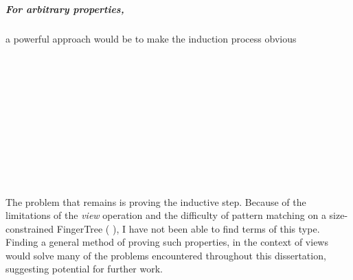 \documentclass[12pt,twoside,notitlepage]{report}
\begin{document}
\subparagraph{For arbitrary properties,} a powerful approach would be to make the induction process obvious

\begin{code}
\\
\>[0]\<[6]%
\>[6] \AgdaSymbol{:}     \<%
\end{code}
\begin{code}
\\
\>[0]\<[6]%
\>[6] \AgdaSymbol{:}  \AgdaSymbol{\{} \AgdaSymbol{:} \AgdaSymbol{\}}\<%
\\
\>[6]\<[16]%
\>[16] \AgdaSymbol{(} \AgdaSymbol{:}   \AgdaSymbol{((} \AgdaSymbol{)}  \AgdaSymbol{))}\<%
\\
\>[6]\<[16]%
\>[16] \AgdaSymbol{(} \AgdaSymbol{:}  \AgdaSymbol{)}\<%
\\
\>[6]\<[16]%
\>[16] \AgdaSymbol{(} \AgdaSymbol{:}   \AgdaSymbol{)}\<%
\\
\>[6]\<[16]%
\>[16] \AgdaSymbol{(}     \AgdaSymbol{)}\<%
\\
\>[6]\<[16]%
\>[16] \AgdaSymbol{(} \AgdaSymbol{(} \AgdaSymbol{))}\<%
\\
\>[6]\<[16]%
\>[16] \AgdaSymbol{(} \AgdaSymbol{(} \AgdaSymbol{))}\<%
\\
\end{code}
The problem that remains is proving the inductive step. Because of the limitations of the \textit{view} operation and the difficulty of pattern matching on a size-constrained FingerTree (  \AgdaSymbol{((} \AgdaSymbol{)}  \AgdaSymbol{))}), I have not been able to find terms of this type. \\ Finding a general method of proving such properties, in the context of views \cite{wadler} would solve many of the problems encountered throughout this dissertation, suggesting potential for further work.
\end{document}
